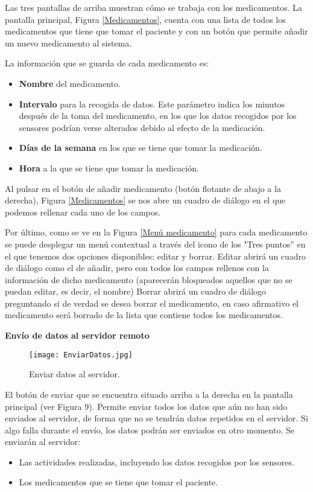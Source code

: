 \documentclass[11pt,spanish]{article}
\begin{document}
Las tres pantallas de arriba muestran cómo se trabaja con los medicamentos. La pantalla principal, Figura \ref{Medicamentos}, cuenta con una lista de todos los medicamentos que tiene que tomar el paciente y con un botón que permite añadir un nuevo medicamento al sistema.
\newline

La información que se guarda de cada medicamento es:

\begin{itemize}
	\item {\bf Nombre} del medicamento.
	\item {\bf Intervalo} para la recogida de datos. Este parámetro indica los minutos después de la toma del medicamento, en los que los datos recogidos por los sensores podrían verse alterados debido al efecto de la medicación.
	\item {\bf Días de la semana} en los que se tiene que tomar la medicación.
	\item {\bf Hora} a la que se tiene que tomar la medicación.
\end{itemize}

Al pulsar en el botón de añadir medicamento (botón flotante de abajo a la derecha), Figura \ref{Medicamentos} se nos abre un cuadro de diálogo en el que podemos rellenar cada uno de los campos.
\newline

Por último, como se ve en la Figura \ref{Menú medicamento} para cada medicamento se puede desplegar un menú contextual a través del icono de los "Tres puntos'' en el que tenemos dos opciones disponibles: editar y borrar. Editar abrirá un cuadro de diálogo como el de añadir, pero con todos los campos rellenos con la información de dicho medicamento (aparecerán bloqueados aquellos que no se puedan editar, es decir, el nombre) Borrar abrirá un cuadro de diálogo preguntando si de verdad se desea borrar el medicamento, en caso afirmativo el medicamento será borrado de la lista que contiene todos los medicamentos.
\newline

{\bf Envío de datos al servidor remoto}
\newline
\begin{figure}[!htb]
\centering
\texttt{[image: EnviarDatos.jpg]}
\caption{Enviar datos al servidor.}
\end{figure}

El botón de enviar que se encuentra situado arriba a la derecha en la pantalla principal (ver Figura 9). Permite enviar todos los datos que aún no han sido enviados al servidor, de forma que no se tendrán datos repetidos en el servidor. Si algo falla durante el envío, los datos podrán ser enviados en otro momento. Se enviarán al servidor:
\begin{itemize}
	\item Las actividades realizadas, incluyendo los datos recogidos por los sensores.
	\item Los medicamentos que se tiene que tomar el paciente.
\end{itemize}
\end{document}
